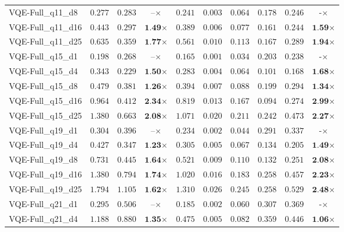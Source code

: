 \begin{table*}[t]
{\begin{tabular}{| l || r r c || r r r r r c |}
VQE-Full\_q11\_d8 & $0.277$ & $0.283$ & $\textbf{--}$$\times$ & $0.241$ & $0.003$ & $0.064$ & $0.178$ & $0.246$ & $\textbf{-}$$\times$ \\
VQE-Full\_q11\_d16 & $0.443$ & $0.297$ & $\textbf{1.49}$$\times$ & $0.389$ & $0.006$ & $0.077$ & $0.161$ & $0.244$ & $\textbf{1.59}$$\times$ \\
VQE-Full\_q11\_d25 & $0.635$ & $0.359$ & $\textbf{1.77}$$\times$ & $0.561$ & $0.010$ & $0.113$ & $0.167$ & $0.289$ & $\textbf{1.94}$$\times$ \\
VQE-Full\_q15\_d1 & $0.198$ & $0.268$ & $\textbf{--}$$\times$ & $0.165$ & $0.001$ & $0.034$ & $0.203$ & $0.238$ & $\textbf{-}$$\times$ \\
VQE-Full\_q15\_d4 & $0.343$ & $0.229$ & $\textbf{1.50}$$\times$ & $0.283$ & $0.004$ & $0.064$ & $0.101$ & $0.168$ & $\textbf{1.68}$$\times$ \\
VQE-Full\_q15\_d8 & $0.479$ & $0.381$ & $\textbf{1.26}$$\times$ & $0.394$ & $0.007$ & $0.088$ & $0.199$ & $0.294$ & $\textbf{1.34}$$\times$ \\
VQE-Full\_q15\_d16 & $0.964$ & $0.412$ & $\textbf{2.34}$$\times$ & $0.819$ & $0.013$ & $0.167$ & $0.094$ & $0.274$ & $\textbf{2.99}$$\times$ \\
VQE-Full\_q15\_d25 & $1.380$ & $0.663$ & $\textbf{2.08}$$\times$ & $1.071$ & $0.020$ & $0.211$ & $0.242$ & $0.473$ & $\textbf{2.27}$$\times$ \\
VQE-Full\_q19\_d1 & $0.304$ & $0.396$ & $\textbf{--}$$\times$ & $0.234$ & $0.002$ & $0.044$ & $0.291$ & $0.337$ & $\textbf{-}$$\times$ \\
VQE-Full\_q19\_d4 & $0.427$ & $0.347$ & $\textbf{1.23}$$\times$ & $0.305$ & $0.005$ & $0.067$ & $0.134$ & $0.205$ & $\textbf{1.49}$$\times$ \\
VQE-Full\_q19\_d8 & $0.731$ & $0.445$ & $\textbf{1.64}$$\times$ & $0.521$ & $0.009$ & $0.110$ & $0.132$ & $0.251$ & $\textbf{2.08}$$\times$ \\
VQE-Full\_q19\_d16 & $1.380$ & $0.794$ & $\textbf{1.74}$$\times$ & $1.020$ & $0.016$ & $0.183$ & $0.258$ & $0.457$ & $\textbf{2.23}$$\times$ \\
VQE-Full\_q19\_d25 & $1.794$ & $1.105$ & $\textbf{1.62}$$\times$ & $1.310$ & $0.026$ & $0.245$ & $0.258$ & $0.529$ & $\textbf{2.48}$$\times$ \\
VQE-Full\_q21\_d1 & $0.295$ & $0.506$ & $\textbf{--}$$\times$ & $0.185$ & $0.002$ & $0.060$ & $0.307$ & $0.369$ & $\textbf{-}$$\times$ \\
VQE-Full\_q21\_d4 & $1.188$ & $0.880$ & $\textbf{1.35}$$\times$ & $0.475$ & $0.005$ & $0.082$ & $0.359$ & $0.446$ & $\textbf{1.06}$$\times$ \\

\end{tabular}}
\end{table*}
